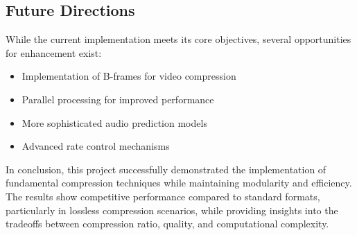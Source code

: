 \documentclass[a4paper,14pt]{article}
\begin{document}
\subsection{Future Directions}
While the current implementation meets its core objectives, several opportunities for enhancement exist:
\begin{itemize}
    \item Implementation of B-frames for video compression
    \item Parallel processing for improved performance
    \item More sophisticated audio prediction models
    \item Advanced rate control mechanisms
\end{itemize}

In conclusion, this project successfully demonstrated the implementation of fundamental compression techniques while maintaining modularity and efficiency. The results show competitive performance compared to standard formats, particularly in lossless compression scenarios, while providing insights into the tradeoffs between compression ratio, quality, and computational complexity.
\end{document}
